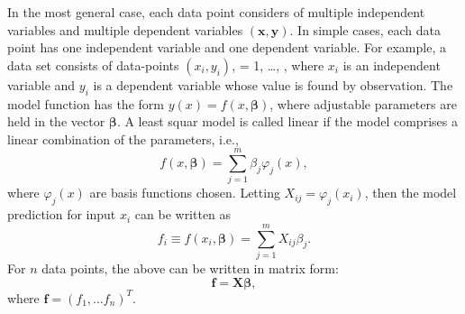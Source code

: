 \documentclass{article}
\newcommand{\tmtextit}[1]{\text{{\itshape{#1}}}}
\begin{document}
In the most general case, each data point considers of multiple independent
variables and multiple dependent variables $(\mathbf{x}, \mathbf{y})$. In
simple cases, each data point has one independent variable and one dependent
variable. For example, a data set consists of \tmtextit{n} data-points $(x_i,
y_i)$, \tmtextit{i} = 1, {\ldots}, \tmtextit{n}, where $x_i$ is an independent
variable and $y_i$ is a dependent variable whose value is found by
observation. The model function has the form $y (x) = f (x, \mathbf{\beta})$,
where \tmtextit{m} adjustable parameters are held in the vector
$\mathbf{\beta}$. A least squar model is called linear if the model comprises
a linear combination of the parameters, i.e.,
\begin{equation}
  f (x, \mathbf{\beta}) = \sum_{j = 1}^m \beta_j \varphi_j (x),
\end{equation}
where $\varphi_j (x)$ are basis functions chosen. Letting $X_{i j} = \varphi_j
(x_i)$, then the model prediction for input $x_i$ can be written as
\begin{equation}
  f_i \equiv f (x_i, \mathbf{\beta}) = \sum_{j = 1}^m X_{i j} \beta_j .
\end{equation}
For $n$ data points, the above can be written in matrix form:
\begin{equation}
  \mathbf{f}=\mathbf{X}\mathbf{\beta},
\end{equation}
where $\mathbf{f}= (f_1, \ldots f_n)^T$.
\end{document}
